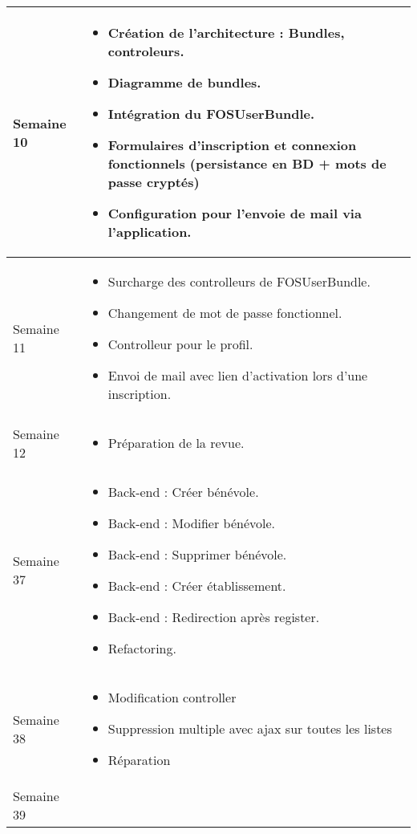 \documentclass [a4paper] {article}
\begin{document}
\begin{longtable}{|>{\columncolor{gray!40}}p{2cm}|p{12cm}|}
	\hline
        Semaine 10 & \begin{itemize}
	\item Création de l'architecture : Bundles, controleurs. 
        \item Diagramme de bundles.
        \item Intégration du FOSUserBundle.
        \item Formulaires d'inscription et connexion fonctionnels (persistance en BD + mots de passe cryptés)
        \item Configuration pour l'envoie de mail via l'application.  
	\end{itemize} \\
	\hline
        Semaine 11 & \begin{itemize}
	\item Surcharge des controlleurs de FOSUserBundle. 
        \item Changement de mot de passe fonctionnel.
        \item Controlleur pour le profil.
        \item Envoi de mail avec lien d'activation lors d'une inscription.  
	\end{itemize} \\
	\hline
	Semaine 12 & \begin{itemize}
	\item Préparation de la revue.
	\end{itemize} \\
	\hline
	Semaine 37 & \begin{itemize}
	\item Back-end : Créer bénévole.
	\item Back-end : Modifier bénévole.
	\item Back-end : Supprimer bénévole.
	\item Back-end : Créer établissement.
	\item Back-end : Redirection après register.
	\item Refactoring.
	\end{itemize} \\
	\hline
	Semaine 38 & \begin{itemize}
	\item Modification controller
	\item Suppression multiple avec ajax sur toutes les listes
	\item Réparation
	\end{itemize} \\
	\hline
	Semaine 39 & \begin{itemize}

\end{itemize}
\end{longtable}
\end{document}
